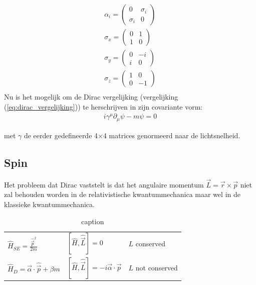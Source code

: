 \documentclass[../main.tex]{subfiles}
\begin{document}
\begin{equation}
    \begin{aligned}
        \label{eq:dirac_alpha}
        \alpha_i=
        \begin{pmatrix}
            0 & \sigma_i\\
            \sigma_i & 0
        \end{pmatrix}\\
        \sigma_x=
        \begin{pmatrix}
            0 & 1\\
            1 & 0
        \end{pmatrix}\\
        \sigma_y=
        \begin{pmatrix}
            0 & -i\\
            i & 0
        \end{pmatrix}\\
        \sigma_z=
        \begin{pmatrix}
            1 & 0\\
            0 & -1
        \end{pmatrix}\\
    \end{aligned}
\end{equation}
Nu is het mogelijk om de Dirac vergelijking (vergelijking (\ref{eq:dirac_vergelijking})) te herschrijven in zijn covariante vorm:
\begin{equation}
    \begin{aligned}
        \label{eq:dirac_covariant}
        i\gamma^\mu\partial_\mu\psi - m\psi =0
    \end{aligned}
\end{equation}

met $\gamma$ de eerder gedefineerde 4$\times$4 matrices genormeerd naar de lichtsnelheid.

\subsection{Spin}%
\label{sub:spin}

Het probleem dat Dirac vaststelt is dat het angulaire momentum $\vec{L}=\vec{r}\times\vec{p}$ niet zal behouden worden in de relativistische kwantummechanica maar wel in de klassieke kwantummechanica.

\begin{table}[h]
    \centering
    \caption{caption}
    \label{tab:rel_vs_klas_kwan}
    \begin{tabular}{l|l|l}
        $\hat{H}_{SE} = \frac{\hat{\vec{p}}^2}{2m}$             & $[\hat{H},\hat{\vec{L}}]=0$                           & $L$ conserved \\
        $\hat{H}_D = \vec{\alpha}\cdot \hat{\vec{p}}+\beta m$   & $[\hat{H},\hat{\vec{L}}]=-i\vec{\alpha}\cdot \vec{p}$ & $L$ not conserved
    \end{tabular}
\end{table}
\end{document}
